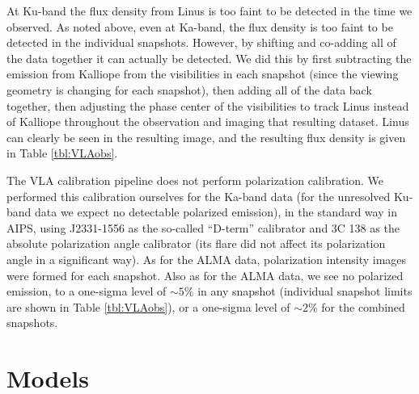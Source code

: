 \documentclass[]{aastex631}
\begin{document}
At Ku-band the flux density from Linus is too faint to be detected in the time we observed.  As noted above, even at Ka-band, the flux density is too faint to be detected in the individual snapshots.  However, by shifting and co-adding all of the data together it can actually be detected.  We did this by first subtracting the emission from Kalliope from the visibilities in each snapshot (since the viewing geometry is changing for each snapshot), then adding all of the data back together, then adjusting the phase center of the visibilities to track Linus instead of Kalliope throughout the observation \citep{butler1999} and imaging that resulting dataset.  Linus can clearly be seen in the resulting image, and the resulting flux density is given in Table \ref{tbl:VLAobs}.

The VLA calibration pipeline does not perform polarization calibration.  We performed this calibration ourselves for the Ka-band data (for the unresolved Ku-band data we expect no detectable polarized emission), in the standard way in AIPS, using J2331-1556 as the so-called ``D-term'' calibrator and 3C 138 as the absolute polarization angle calibrator (its flare did not affect its polarization angle in a significant way).  As for the ALMA data, polarization intensity images were formed for each snapshot.  Also as for the ALMA data, we see no polarized emission, to a one-sigma level of ${\sim}5\%$ in any snapshot (individual snapshot limits are shown in Table \ref{tbl:VLAobs}), or a one-sigma level of ${\sim}2\%$ for the combined snapshots.

\section{Models\label{sec:models}}
\end{document}
